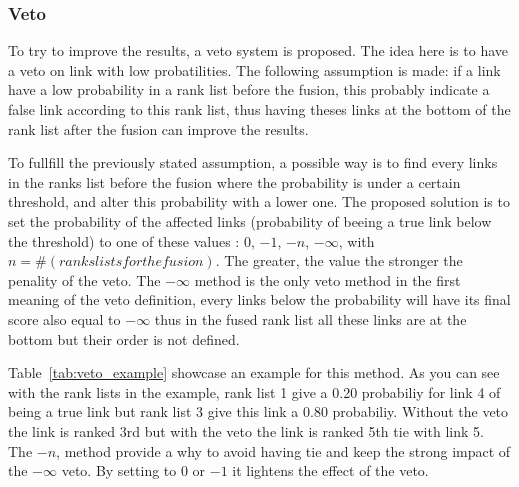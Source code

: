 \subsubsection{Veto}

To try to improve the results, a veto system is proposed.
The idea here is to have a veto on link with low probatilities.
The following assumption is made: if a link have a low probability in a rank list before the fusion, this probably indicate a false link according to this rank list, thus having theses links at the bottom of the rank list after the fusion can improve the results.

To fullfill the previously stated assumption, a possible way is to find every links in the ranks list before the fusion where the probability is under a certain threshold, and alter this probability with a lower one.
The proposed solution is to set the probability of the affected links (probability of beeing a true link below the threshold) to one of these values : $0$, $-1$, $-n$, $-\infty$, with $n = \#(ranks lists for the fusion)$.
The greater, the value the stronger the penality of the veto.
The $-\infty$ method is the only veto method in the first meaning of the veto definition, every links below the probability will have its final score also equal to $-\infty$ thus in the fused rank list all these links are at the bottom but their order is not defined.

Table~\ref{tab:veto_example} showcase an example for this method.
As you can see with the rank lists in the example, rank list 1 give a 0.20 probabiliy for link 4 of being a true link but rank list 3 give this link a 0.80 probabiliy.
Without the veto the link is ranked 3rd but with the veto the link is ranked 5th tie with link 5.
The $-n$, method provide a why to avoid having tie and keep the strong impact of the $-\infty$ veto.
By setting to $0$ or $-1$ it lightens the effect of the veto.

